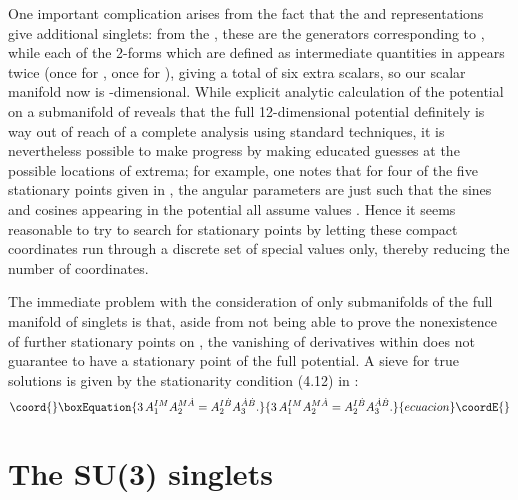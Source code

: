\documentclass[a4paper,12pt]{article}
\begin{document}
One important complication arises from the fact that the \coordHE{} and
\coordHE{} representations give additional \coordHE{} singlets: from the
\coordHE{}, these are the generators corresponding to \myHighlight{$\psipm{}$}\coordHE{}, while
each of the 2-forms \coordHE{} which are defined as intermediate
quantities in \cite{Warner:vz} appears twice (once for \coordHE{}, once for \coordHE{}), giving a total
of six extra scalars, so our scalar manifold \coordHE{} now is
\coordHE{}-dimensional. While explicit analytic calculation of the potential
on a submanifold of \coordHE{} reveals that the full 12-dimensional potential
definitely is way out of reach of a complete analysis using standard
techniques, it is nevertheless possible to make progress by making
educated guesses at the possible locations of extrema; for example,
one notes that for four of the five stationary points given in
\cite{Warner:vz}, the angular parameters are just such that the sines
and cosines appearing in the potential all assume values
\coordHE{}. Hence it seems reasonable to try to search for
stationary points by letting these compact coordinates run through a
discrete set of special values only, thereby reducing the number of
coordinates.

The immediate problem with the consideration of only submanifolds \coordHE{}
of the full manifold \coordHE{} of singlets is that, aside from not being
able to prove the nonexistence of further stationary points on \coordHE{},
the vanishing of derivatives within \coordHE{} does not guarantee to have a
stationary point of the full potential. A sieve for true solutions is
given by the stationarity condition (4.12) in \cite{Nicolai:2001sv}:
%
\begin{equation}\coord{}\boxEquation{
\label{SolutionSieve}
3\,A_1^{IM}A_2^{M\dot A}=A_2^{I\dot B}A_3^{\dot A\dot B}.
}{
3\,A_1^{IM}A_2^{M\dot A}=A_2^{I\dot B}A_3^{\dot A\dot B}.
}{ecuacion}\coordE{}\end{equation}

\vfill

\section{The SU(3) singlets}
\end{document}
